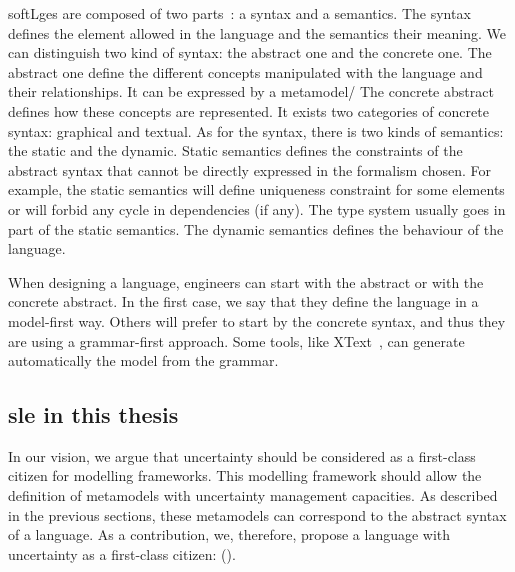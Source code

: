 \Glspl{softLge} are composed of two parts~\cite{DBLP:journals/computer/HarelR04}: a syntax and a semantics.
The syntax defines the element allowed in the language and the semantics their meaning.
We can distinguish two kind of syntax: the abstract one and the concrete one.
The abstract one define the different concepts manipulated with the language and their relationships.
It can be expressed by a \gls{metamodel}/
The concrete abstract defines how these concepts are represented.
It exists two categories of concrete syntax: graphical and textual.
As for the syntax, there is two kinds of semantics: the static and the dynamic.
Static semantics defines the constraints of the abstract syntax that cannot be directly expressed in the formalism chosen.
For example, the static semantics will define uniqueness constraint for some elements or will forbid any cycle in dependencies (if any).
The type system usually goes in part of the static semantics.
The dynamic semantics defines the behaviour of the language.

When designing a language, engineers can start with the abstract or with the concrete abstract.
In the first case, we say that they define the language in a \gls{model}-first way.
Others will prefer to start by the concrete syntax, and thus they are using a grammar-first approach.
Some tools, like XText~\cite{DBLP:conf/oopsla/EysholdtB10}, can generate automatically the model from the grammar.
 

	
\subsection[SLE in this thesis]{\gls{sle} in this thesis}

In our vision, we argue that uncertainty should be considered as a first-class citizen for modelling frameworks.
This modelling framework should allow the definition of \glspl{metamodel} with uncertainty management capacities.
As described in the previous sections, these \glspl{metamodel} can correspond to the abstract syntax of a language.
As a contribution, we, therefore, propose a language with uncertainty as a first-class citizen: \langName (\cf {}).